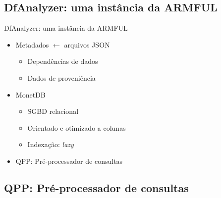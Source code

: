 \documentclass[12pt,compress,final]{beamer}
\begin{document}

\subsection*{DfAnalyzer: uma instância da ARMFUL}

\begin{frame}{DfAnalyzer: uma instância da ARMFUL}
\begin{itemize}
\item Metadados $\leftarrow$ arquivos JSON
\begin{itemize}
\item Dependências de dados
\item Dados de proveniência
\end{itemize}
\item MonetDB
\begin{itemize}
\item SGBD relacional
\item Orientado e otimizado a colunas
\item Indexação: \textit{lazy}
\end{itemize}
\item \alert{QPP: Pré-processador de consultas}
\end{itemize}

\end{frame}


\subsection*{QPP: Pré-processador de consultas}
\end{document}

